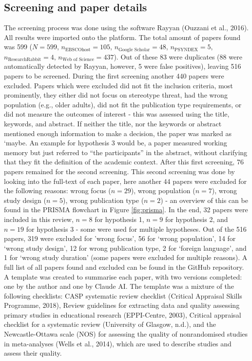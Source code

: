 \documentclass[
  stu]{apa7}
\begin{document}
\subsection{Screening and paper details}\label{screening-and-paper-details}

The screening process was done using the software Rayyan (Ouzzani et al., 2016). All results were imported onto the platform.
The total amount of papers found was 599 (\(N=599\), \(n_{\text{EBSCOhost}} = 105\), \(n_{\text{Google Scholar}} = 48\), \(n_{\text{PSYNDEX}} = 5\), \(n_{\text{ResearchRabbit}} = 4\), \(n_{\text{Web of Science}} = 437\)). Out of these 83 were duplicates (88 were automatically detected by Rayyan, however, 5 were false positives), leaving 516 papers to be screened. During the first screening another 440 papers were excluded.
Papers which were excluded did not fit the inclusion criteria, most prominently, they either did not focus on stereotype threat, had the wrong population (e.g., older adults), did not fit the publication type requirements, or did not measure the outcomes of interest - this was assessed using the title, keywords, and abstract. If neither the title, nor the keywords or abstract mentioned enough information to make a decision, the paper was marked as `maybe.
An example for hypothesis 3 would be, a paper measured working memory but just referred to ``the participants'' in the abstract, without clarifying that they fit the definition of the academic context. After this first screening, 76 papers remained for the second screening.
This second screening was done by looking into the full-text of each paper, here another 44 papers were excluded for the following reasons: wrong focus (\(n = 29\)), wrong population (\(n = 7\)), wrong study design (\(n = 5\)), wrong publication type (\(n = 2\)) - an overview of this can be found in the PRISMA flowchart in Figure \ref{fig:prisma}.
In the end, 32 papers were included in this review, \(n = 8\) for hypothesis 1, \(n = 9\) for hypothesis 2, and \(n = 19\) for hypothesis 3 - some were used for multiple hypotheses. Out of the 516 papers, 319 were excluded for 'wrong focus', 56 for `wrong population', 14 for `wrong study design', 12 for wrong publication type, 2 for `foreign language', and 1 for `wrong study duration' (some papers were excluded for multiple reasons). A full list of all papers found and excluded can be found in the GitHub repository.\\
A template was created to summarise each paper, with two versions completed: one by the author and one by Claude AI.
The template was a mixture of the following checklists: CASP systematic review checklist (Critical Appraisal Skills Programme, 2018), Review guidelines for extracting data and quality assessing primary studies in educational research (EPPI-Centre, 2003), Critical appraisal checklist for a systematic review (University of Glasgow, n.d.), and the Newcastle-Ottawa scale (NOS) for assessing the quality of nonrandomised studies in meta-analyses (Wells et al., 2014), which are used to describe studies and assess their quality.
\end{document}
